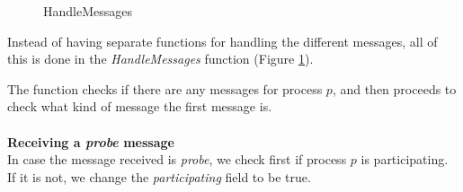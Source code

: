 \documentclass{report}
\begin{document}
\begin{figure}
%
%
\@xx{}%
%
%
\@xx{}%
%
%
\@xx{}%

\@x{}\bottombar\@xx{}%

  \caption{HandleMessages}
  \label{ringhandlemessages}
  \end{figure}

Instead of having separate functions for handling the different messages, all of this is done in the \textit{HandleMessages} function (Figure \ref{ringhandlemessages}).

The function checks if there are any messages for process $p$, and then proceeds to check what kind of message the first message is.
\\\\
\noindent
\textbf{Receiving a \textit{probe} message}\\
\noindent
In case the message received is \textit{probe}, we check first if process $p$ is participating. If it is not, we change the \textit{participating} field to be true.
\end{document}
